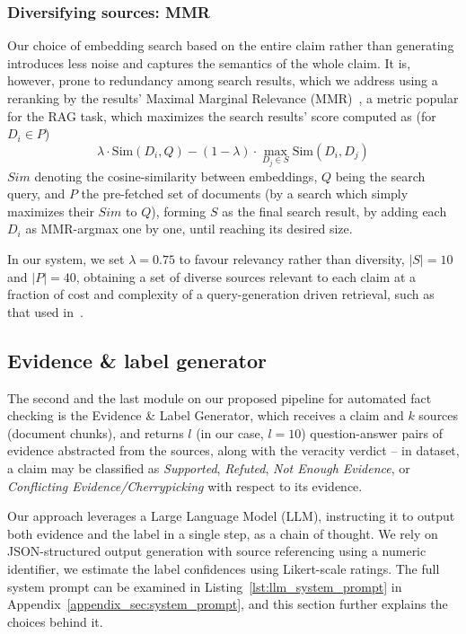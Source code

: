 \subsubsection{Diversifying sources: MMR}
{Our choice of embedding search based on the entire claim rather than generating  introduces less noise and captures the semantics of the whole claim.
It is, however, prone to redundancy among search results, which we address using a reranking by the results' Maximal Marginal Relevance (MMR)~\cite{carbonell-mmr}, a metric popular for the RAG task, which maximizes the search results' score computed as (for $D_i\in P$)
$$\lambda \cdot \mathrm{Sim}(D_i, Q) - (1-\lambda) \cdot \max_{D_j \in S} \mathrm{Sim}(D_i, D_j)$$
$Sim$ denoting the cosine-similarity between embeddings, $Q$ being the search query, and $P$ the pre-fetched set of documents (by a search which simply maximizes their $Sim$ to $Q$), forming $S$ as the final search result, by adding each $D_i$ as MMR-argmax one by one, until reaching its desired size.}

In our system, we set $\lambda=0.75$ to favour relevancy rather than diversity, $|S|=10$ and $|P| = 40$, obtaining a set of diverse sources relevant to each claim at a fraction of cost and complexity of a query-generation driven retrieval, such as that used in~\cite{averitec2024}.

\subsection{Evidence \& label generator}
\label{sec:generation}
The second and the last module on our proposed pipeline for automated fact checking is the Evidence \& Label Generator, which receives a claim and $k$ sources (document chunks), and returns $l$ (in our case, $l=10$) question-answer pairs of evidence abstracted from the sources, along with the veracity verdict -- in \averitec{} dataset, a claim may be classified as \textit{Supported}, \textit{Refuted}, \textit{Not Enough Evidence}, or \textit{Conflicting Evidence/Cherrypicking} with respect to its evidence.

Our approach leverages a Large Language Model (LLM), instructing it to output both evidence and the label in a single step, as a chain of thought.
We rely on JSON-structured output generation with source referencing using a numeric identifier, we estimate the label confidences using Likert-scale ratings.
The full system prompt can be examined in Listing~\ref{lst:llm_system_prompt} {in Appendix~\ref{appendix_sec:system_prompt},} and this section further explains the choices behind it.

